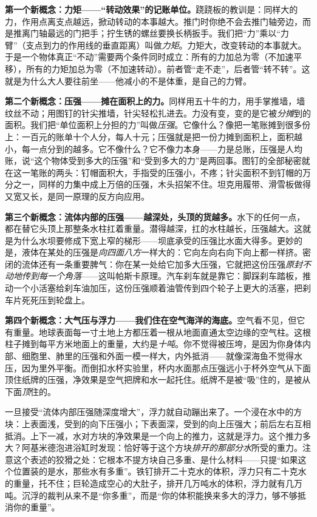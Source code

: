 \begin{mainline}
\textbf{第一个新概念：力矩——“转动效果”的记账单位。}跷跷板的教训是：同样大的力，作用点离支点越远，掀动转动的本事越大。推门时你绝不会去推门轴旁边，而是推离门轴最远的门把手；拧生锈的螺丝要换长柄扳手。我们把“力”乘以“力臂”（支点到力的作用线的垂直距离）叫做\emph{力矩}。力矩大，改变转动的本事就大。于是一个物体真正“不动”需要两个条件同时成立：所有的力加总为零（不加速平移），所有的力矩加总为零（不加速转动）。前者管“走不走”，后者管“转不转”。这就是为什么大人要往前坐——他减小的不是体重，是自己的力臂。

\textbf{第二个新概念：压强——摊在面积上的力。}同样用五十牛的力，用手掌推墙，墙纹丝不动；用图钉的针尖推墙，针尖轻松扎进去。力没有变，变的是它被\emph{分摊}到的面积。我们把“单位面积上分担的力”叫做\emph{压强}。它像什么？像把一笔账摊到很多份上：一百元的账单十个人分，每人十元；压强就是把一份力摊到面积上，面积越小，每一点分到的越多。它不像什么？它不像力本身——力是总账，压强是人均账，说“这个物体受到多大的压强”和“受到多大的力”是两回事。图钉的全部秘密就在这一笔账的两头：钉帽面积大，手指受的压强小，不疼；针尖面积不到钉帽的万分之一，同样的力集中成上万倍的压强，木头招架不住。坦克用履带、滑雪板做得又宽又长，是同一原理的反方向应用。

\textbf{第三个新概念：流体内部的压强——越深处，头顶的货越多。}水下的任何一点，都在替它头顶上那整条水柱扛着重量。潜得越深，扛的水柱越长，压强越大。这就是为什么水坝要修成下宽上窄的梯形——坝底承受的压强比水面大得多。更妙的是，液体在某处的压强是\emph{向四面八方}一样大的：它向左向右向下向上都一样挤。密闭的流体还有一条重要脾气：你在某一处给它加多大压强，它就把这份压强\emph{原封不动地传到每一个角落}——这叫帕斯卡原理。汽车刹车就是靠它：脚踩刹车踏板，推动一个小活塞给刹车油加压，这份压强顺着油管传到四个轮子上更大的活塞，把刹车片死死压到轮盘上。

\textbf{第四个新概念：大气压与浮力——我们住在空气海洋的海底。}空气看不见，但它有重量。地球表面每一寸土地上方都压着一根从地面直通太空边缘的空气柱。这根柱子摊到每平方米地面上的重量，大约是\emph{十吨}。你不觉得被压垮，是因为你身体内部、细胞里、肺里的压强和外面一模一样大，内外抵消——就像深海鱼不觉得水压，因为里外平衡。而倒扣水杯实验里，杯内水面那点压强远小于杯外空气从下面顶住纸牌的压强，净效果是空气把牌和水一起托住。纸牌不是被“吸”住的，是被从下面\emph{顶}住的。

一旦接受“流体内部压强随深度增大”，浮力就自动蹦出来了。一个浸在水中的方块：上表面浅，受到的向下压强小；下表面深，受到的向上压强大；前后左右互相抵消。上下一减，水对方块的净效果是一个向上的推力，这就是浮力。这个推力多大？阿基米德泡进浴缸时发现：恰好等于这个方块\emph{排开的那部分水}所受的重力。注意这个表述的狡猾之处：它根本不提方块自己多重、是什么材料——只提“如果这个位置装的是水，那些水有多重”。铁钉排开二十克水的体积，浮力只有二十克水的重量，托不住；巨轮造成空心的大肚子，排开几万吨水的体积，浮力就有几万吨。沉浮的裁判从来不是“你多重”，而是“你的体积能换来多大的浮力，够不够抵消你的重量”。


\end{mainline}
